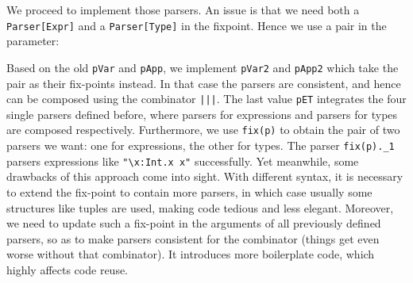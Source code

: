 We proceed to implement those parsers. An issue is that we need both a \lstinline{Parser[Expr]} and a \lstinline{Parser[Type]} in the fixpoint.
Hence we use a pair in the parameter:


Based on the old \lstinline{pVar} and \lstinline{pApp}, we implement \lstinline{pVar2} and \lstinline{pApp2} which take the pair as their fix-points instead.
In that case the parsers are consistent, and hence can be composed using the combinator \lstinline{|||}.
The last value \lstinline{pET} integrates the four single parsers defined before, where parsers for expressions and parsers for types are composed respectively. Furthermore, we use \lstinline{fix(p)} to obtain the pair of two parsers we want: one for expressions, the other for types. The parser \lstinline{fix(p)._1} parsers expressions like \lstinline{"\x:Int.x x"} successfully. Yet meanwhile, some drawbacks of this approach come into sight. With different syntax, it
is necessary to extend the fix-point to contain more parsers, in which case usually some structures like tuples are used,
making code tedious and less elegant. Moreover, we need to update such a fix-point in the arguments of all previously defined parsers, so as to make parsers consistent for the combinator (things get even worse without that combinator). It introduces more boilerplate code, which highly affects code reuse.

